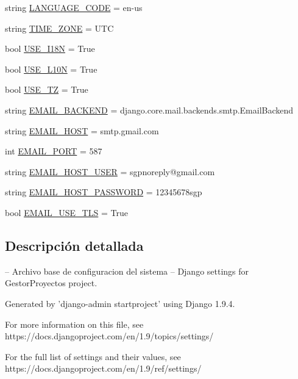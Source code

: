 \begin{DoxyCompactItemize}
\item 
string \hyperlink{namespace_gestor_proyectos_1_1settings_1_1base_ac34d02e015f26bedb6fada92be8d4e5a}{L\+A\+N\+G\+U\+A\+G\+E\+\_\+\+C\+O\+DE} = \textquotesingle{}en-\/us\textquotesingle{}
\item 
string \hyperlink{namespace_gestor_proyectos_1_1settings_1_1base_a10f7aed2be6a1ec9fb8bedb6c5eebd83}{T\+I\+M\+E\+\_\+\+Z\+O\+NE} = \textquotesingle{}U\+TC\textquotesingle{}
\item 
bool \hyperlink{namespace_gestor_proyectos_1_1settings_1_1base_af0547c777b06e12e1ac8816824b55435}{U\+S\+E\+\_\+\+I18N} = True
\item 
bool \hyperlink{namespace_gestor_proyectos_1_1settings_1_1base_a723a2313195a86c49be17bc05f0d8d43}{U\+S\+E\+\_\+\+L10N} = True
\item 
bool \hyperlink{namespace_gestor_proyectos_1_1settings_1_1base_a7e2c87b697877a56ac16e367e3a2aa8d}{U\+S\+E\+\_\+\+TZ} = True
\item 
string \hyperlink{namespace_gestor_proyectos_1_1settings_1_1base_a2b3cf4f8462bbff304c41c5d2daf7a14}{E\+M\+A\+I\+L\+\_\+\+B\+A\+C\+K\+E\+ND} = \textquotesingle{}django.\+core.\+mail.\+backends.\+smtp.\+Email\+Backend\textquotesingle{}
\item 
string \hyperlink{namespace_gestor_proyectos_1_1settings_1_1base_aaa32ba5496cbde103de82003dc94a664}{E\+M\+A\+I\+L\+\_\+\+H\+O\+ST} = \textquotesingle{}smtp.\+gmail.\+com\textquotesingle{}
\item 
int \hyperlink{namespace_gestor_proyectos_1_1settings_1_1base_a31920e77a5f1e9004cafd753307560e5}{E\+M\+A\+I\+L\+\_\+\+P\+O\+RT} = 587
\item 
string \hyperlink{namespace_gestor_proyectos_1_1settings_1_1base_aae76b4d648bf8dd8cec056a06b191af3}{E\+M\+A\+I\+L\+\_\+\+H\+O\+S\+T\+\_\+\+U\+S\+ER} = \textquotesingle{}sgpnoreply@gmail.\+com\textquotesingle{}
\item 
string \hyperlink{namespace_gestor_proyectos_1_1settings_1_1base_a2ddbe00334d2bfb39a4d7803a894808a}{E\+M\+A\+I\+L\+\_\+\+H\+O\+S\+T\+\_\+\+P\+A\+S\+S\+W\+O\+RD} = \textquotesingle{}12345678sgp\textquotesingle{}
\item 
bool \hyperlink{namespace_gestor_proyectos_1_1settings_1_1base_a9c69dc21cacf6ddc69ebc4eda6c32fb9}{E\+M\+A\+I\+L\+\_\+\+U\+S\+E\+\_\+\+T\+LS} = True
\end{DoxyCompactItemize}


\subsection{Descripción detallada}
\begin{DoxyVerb}-- Archivo base de configuracion del sistema --
Django settings for GestorProyectos project.

Generated by 'django-admin startproject' using Django 1.9.4.

For more information on this file, see
https://docs.djangoproject.com/en/1.9/topics/settings/

For the full list of settings and their values, see
https://docs.djangoproject.com/en/1.9/ref/settings/
\end{DoxyVerb}
 

